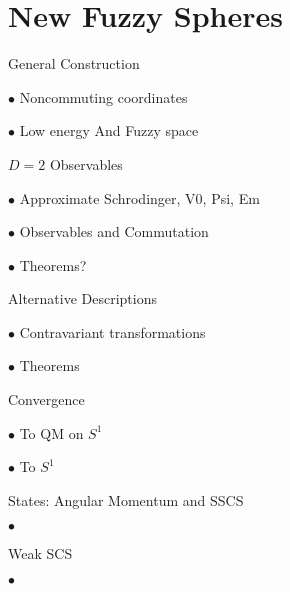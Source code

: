\section{New Fuzzy Spheres}

\begin{frame}{General Construction} %

    $\bullet$ Noncommuting coordinates
    
    $\bullet$ Low energy And Fuzzy space
    
\end{frame}

\begin{frame}{$D = 2$ Observables} %

    $\bullet$ Approximate Schrodinger, V0, Psi, Em
    
    $\bullet$ Observables and Commutation
    
    $\bullet$ Theorems?

\end{frame}

\begin{frame}{Alternative Descriptions} %

     $\bullet$ Contravariant transformations
     
     $\bullet$ Theorems
    
\end{frame}

\begin{frame}{Convergence} %

    $\bullet$ To QM on $S^1$
    
    $\bullet$ To $S^1$
    
\end{frame}

\begin{frame}{States: Angular Momentum and SSCS} %

    $\bullet$ \iff
    
\end{frame}

\begin{frame}{Weak SCS} %

    $\bullet$ 
    
\end{frame}